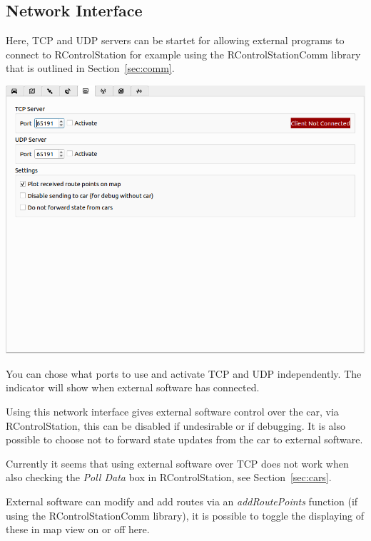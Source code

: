 \documentclass[12pt]{article} %
\begin{document}
\subsection{Network Interface}

Here, TCP and UDP servers can be startet for allowing external programs to connect
to RControlStation for example using the RControlStationComm library that is outlined
in Section~\ref{sec:comm}.

\noindent\begin{minipage}{0.5\textwidth}
\noindent \includegraphics[width=\textwidth]{./screens/network_interface.png}
\end{minipage}
\begin{minipage}{0.5\textwidth}

You can chose what ports to use and activate TCP and UDP independently. The indicator will
show when external software has connected.

Using this network interface gives external software control over the
car, via RControlStation, this can be disabled if undesirable or if
debugging. It is also possible to choose not to forward state updates
from the car to external software.

Currently it seems that using external software over TCP does not work
when also checking the {\em Poll Data} box in RControlStation, see
Section~\ref{sec:cars}.
\end{minipage}
External software can modify and add routes via an {\em
  addRoutePoints} function (if using the RControlStationComm library),
it is possible to toggle the displaying of these in map view on or off
here.
\end{document}
